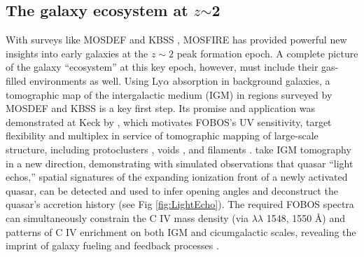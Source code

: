 
\subsection{The galaxy ecosystem at $z$$\sim$2}
\label{sec:z2galaxies}

With surveys like MOSDEF \citep{kriek15} and KBSS \citep[e.g.,][]{steidel14}, MOSFIRE has provided powerful new
insights into early galaxies at the $z \sim 2$ peak formation epoch.  A complete picture of the galaxy ``ecosystem'' at
this key epoch, however, must include their gas-filled environments as well.  Using Ly$\alpha$ absorption in background
galaxies, a tomographic map of the intergalactic medium (IGM) in regions surveyed by MOSDEF and KBSS is a key first
step. Its promise and application was demonstrated at Keck by \citet{lee14}, which motivates FOBOS's UV sensitivity,
target flexibility and multiplex in service of tomographic mapping of large-scale structure, including protoclusters
\citep{lee16}, voids \citep{krolewski18}, and filaments \citep{horowitz19}.  \citet{2018arXiv181005156S} take IGM
tomography in a new direction, demonstrating with simulated observations that quasar ``light echos,'' spatial
signatures of the expanding ionization front of a newly activated quasar, can be detected and used to infer opening
angles and deconstruct the quasar's accretion history (see Fig \ref{fig:LightEcho}).  The required FOBOS spectra can simultaneously constrain the C IV mass density (via $\lambda\lambda$ 1548, 1550 \AA) and patterns of C IV enrichment on both IGM and cicumgalactic scales, revealing the imprint of galaxy fueling and feedback processes \citep[e.g.,][]{tumlinson17}.



